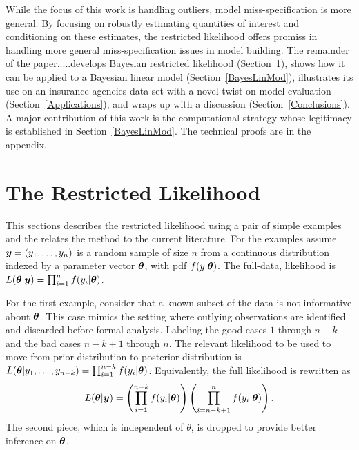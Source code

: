 \documentclass[11pt]{article}
\def\bth{\mbox{\boldmath $\theta$}}
\newcommand{\by}{\mbox{\boldmath $y$}}
\begin{document}
While the focus of this work is handling outliers, model miss-specification is more general. By focusing on robustly estimating quantities of interest and conditioning on these estimates, the restricted likelihood offers promiss in handling more general miss-specification issues in model building. The remainder of the paper.....develops Bayesian restricted likelihood (Section~\ref{restrictedlikelihood}), shows
how it can be applied to a Bayesian linear model (Section~\ref{BayesLinMod}), illustrates its use
on an insurance agencies data set with a novel twist on model evaluation (Section~\ref{Applications}), 
and wraps up with a discussion (Section~\ref{Conclusions}).  
A major contribution of this work is the computational strategy whose legitimacy is established 
in Section~\ref{BayesLinMod}.  The technical proofs are in the appendix.   

\section{The Restricted Likelihood}
\label{restrictedlikelihood}

This sections describes the restricted likelihood using a pair of simple examples and the relates the method to the current literature. For the examples assume $\by=(y_1,\ldots,y_n)$ is a random sample
of size $n$ from a continuous distribution indexed by a parameter
vector $\bth$, with pdf $f(y| \bth)$.  The full-data, likelihood is $L(\bth | \by) = \prod_{i=1}^n f(y_i | \bth)$.  

For the first example, consider that a known subset of the data is not informative about $\bth$.  This case mimics the setting where outlying observations  are identified and discarded before formal analysis. 
Labeling the good cases $1$ through $n-k$ and the bad cases $n-k+1$ through $n$.  
The relevant likelihood to be used to move from prior distribution to posterior distribution is 
$L(\bth | y_1, \ldots, y_{n-k}) = \prod_{i=1}^{n-k} f(y_i | \bth)$.  
Equivalently,  the full 
likelihood is rewritten as 
\begin{eqnarray}
\label{OutlyingCases}
L(\bth | \by)  
= \left( \prod_{i=1}^{n-k} f(y_i | \bth) \right) \left( \prod_{i=n-k+1}^{n} f(y_i | \bth) \right) .  
\end{eqnarray}
The second piece, which is independent of $\theta$,  is dropped to provide better inference on $\bth$.  
\end{document}

